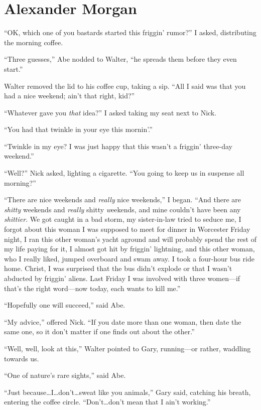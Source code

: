 \chapter{Alexander Morgan}

\titlemark

``OK, which one of you bastards started this friggin' rumor?'' I asked,
distributing the morning coffee.

``Three guesses,'' Abe nodded to Walter, ``he spreads them before they
even start.''

Walter removed the lid to his coffee cup, taking a sip. ``All I said was
that you had a nice weekend; ain't that right, kid?''

``Whatever gave you \emph{that} idea?'' I asked taking my seat next to
Nick.

``You had that twinkle in your eye this mornin'.''

``Twinkle in my eye? I was just happy that this wasn't a friggin'
three-day weekend.''

``Well?'' Nick asked, lighting a cigarette. ``You going to keep us in
suspense all morning?''

``There are nice weekends and \emph{really} nice weekends,'' I began.
``And there are \emph{shitty} weekends and \emph{really} shitty
\emph{w}eekends, and mine couldn't have been any \emph{shittier}. We got
caught in a bad storm, my sister-in-law tried to seduce me, I forgot
about this woman I was supposed to meet for dinner in Worcester Friday
night, I ran this other woman's yacht aground and will probably spend
the rest of my life paying for it, I almost got hit by friggin'
lightning, and this other woman, who I really liked, jumped overboard
and swam away. I took a four-hour bus ride home. Christ, I was surprised
that the bus didn't explode or that I wasn't abducted by friggin'
aliens. Last Friday I was involved with three women---if that's the
right word---now today, each wants to kill me.''

``Hopefully one will succeed,'' said Abe.

``My advice,'' offered Nick. ``If you date more than one woman, then
date the same one, so it don't matter if one finds out about the
other.''

``Well, well, look at this,'' Walter pointed to Gary, running---or
rather, waddling towards us.

``One of nature's rare sights,'' said Abe.

``Just because\ldots I\ldots don't\ldots sweat like you animals,'' Gary
said, catching his breath, entering the coffee circle.
``Don't\ldots don't mean that I ain't working.''

